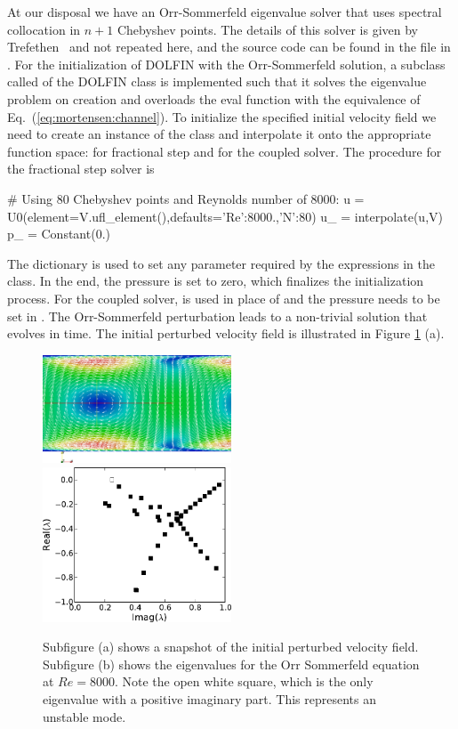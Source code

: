 At our disposal we have an Orr-Sommerfeld eigenvalue solver that uses spectral collocation in $n+1$ Chebyshev points. The details of this solver is given by Trefethen~\cite{Trefethen2006} and not repeated here, and the source code can be found in the file  in \cite{folder}. For the initialization of DOLFIN  with the Orr-Sommerfeld solution, a subclass called  of the DOLFIN class  is implemented such that it solves the eigenvalue problem on creation and overloads the eval function with the equivalence of Eq.~(\eqref{eq:mortensen:channel}). To initialize the specified initial velocity field we need to create an instance of the  class and interpolate it onto the appropriate function space:  for fractional step and  for the coupled solver. The procedure for the fractional step solver is
\begin{python}
    # Using 80 Chebyshev points and Reynolds number of 8000:
    u = U0(element=V.ufl_element(),defaults={'Re':8000.,'N':80}) 
    u_ = interpolate(u,V)
    p_ = Constant(0.)
\end{python}
The  dictionary is used to set any parameter required by the 
expressions in the  class. In the end, the pressure is set to zero, which finalizes the initialization process. For the coupled solver,  is used in place of  and the pressure needs to be set in . The Orr-Sommerfeld perturbation leads to a non-trivial solution that evolves in time. The initial perturbed velocity field is illustrated in Figure \ref{fig:mortensen:OS_init} (a).
\begin{figure}
\includegraphics[width=0.5\textwidth]{chapters/mortensen/pdf/OS_init.pdf}
\includegraphics[width=0.5\textwidth]{chapters/mortensen/pdf/OrrS_eigvals.pdf}
\caption{Subfigure (a) shows a snapshot of the initial perturbed velocity field. Subfigure (b) shows the eigenvalues for the Orr Sommerfeld equation at $Re=8000$. Note the open white square, which is the only eigenvalue with a positive imaginary part. This represents an unstable mode.}
 \label{fig:mortensen:OS_init}
\end{figure}

